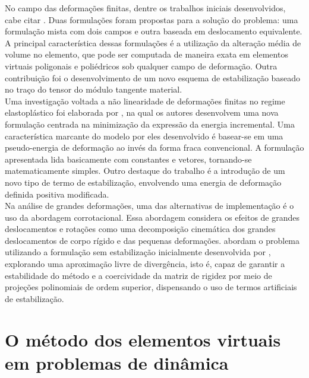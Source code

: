 \indent No campo das deformações finitas, dentre os trabalhos iniciais desenvolvidos, cabe citar \citet{basicformulationsvirtualelementmethodvemfinitedeformations2017}. Duas formulações foram propostas para a solução do problema: uma formulação mista com dois campos e outra baseada em deslocamento equivalente. A principal característica dessas formulações é a utilização da alteração média de volume no elemento, que pode ser computada de maneira exata em elementos virtuais poligonais e poliédricos sob qualquer campo de deformação. Outra contribuição foi o desenvolvimento de um novo esquema de estabilização baseado no traço do tensor do módulo tangente material. \\
\indent Uma investigação voltada a não linearidade de deformações finitas no regime elastoplástico foi elaborada por \citet{lowordervirtualelementformulationfiniteelastoplasticdeformations2017}, na qual os autores desenvolvem uma nova formulação centrada na minimização da expressão da energia incremental. Uma característica marcante do modelo por eles desenvolvido é basear-se em uma pseudo-energia de deformação ao invés da forma fraca convencional. A formulação apresentada lida basicamente com constantes e vetores, tornando-se matematicamente simples. Outro destaque do trabalho é a introdução de um novo tipo de termo de estabilização, envolvendo uma energia de deformação definida positiva modificada.  \\
\indent Na análise de grandes deformações, uma das alternativas de implementação é o uso da abordagem corrotacional. Essa abordagem considera os efeitos de grandes deslocamentos e rotações como uma decomposição cinemática dos grandes deslocamentos de corpo rígido e das pequenas deformações. \citet{enhancedcorotationalvirtualelementmethodlargedisplacementsplaneelasticity2024} abordam o problema utilizando a formulação sem estabilização inicialmente desenvolvida por \citet{lowestorderstabilizationfreevirtualelementmethod2dpoissonequation2025}, explorando uma aproximação livre de divergência, isto é, capaz de garantir a estabilidade do método e a coercividade da matriz de rigidez por meio de projeções polinomiais de ordem superior, dispensando o uso de termos artificiais de estabilização. 

\section{O método dos elementos virtuais em problemas de dinâmica}

